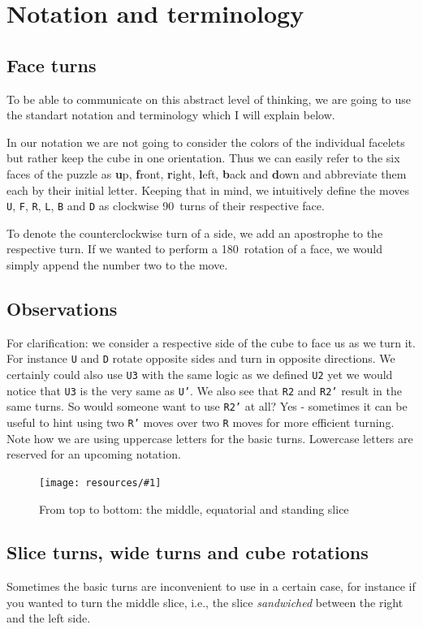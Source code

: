 \documentclass[a4paper]{scrreprt}
\newcommand{\img}[3]{
	\begin{figure}[ht]
	\centering
  \texttt{[image: resources/\#1]}
	\caption{#3}
	\end{figure}
}
\begin{document}
\section{Notation and terminology}
\subsection{Face turns}
To be able to communicate on this abstract level of thinking, we are going to use the standart notation and terminology which I will explain below.\par
In our notation we are not going to consider the colors of the individual facelets but rather keep the cube in one orientation. Thus we can easily refer to the six faces of the puzzle as \textbf{u}p, \textbf{f}ront, \textbf{r}ight, \textbf{l}eft, \textbf{b}ack and \textbf{d}own and abbreviate them each by their initial letter. Keeping that in mind, we intuitively define the moves \texttt{U}, \texttt{F}, \texttt{R}, \texttt{L}, \texttt{B} and \texttt{D} as clockwise 90\textdegree\ turns of their respective face.\par
To denote the counterclockwise turn of a side, we add an apostrophe to the respective turn. If we wanted to perform a 180\textdegree\ rotation of a face, we would simply append the number two to the move.


\subsection{Observations}
For clarification: we consider a respective side of the cube to face us as we turn it. For instance \texttt{U} and \texttt{D} rotate opposite sides and turn in opposite directions. We certainly could also use \texttt{U3} with the same logic as we defined \texttt{U2} yet we would notice that \texttt{U3} is the very same as \texttt{U'}. We also see that \texttt{R2} and \texttt{R2'} result in the same turns. So would someone want to use \texttt{R2'} at all? Yes - sometimes it can be useful to hint using two \texttt{R'} moves over two \texttt{R} moves for more efficient turning. Note how we are using uppercase letters for the basic turns. Lowercase letters are reserved for an upcoming notation.

\img{slices.png}{0.4}{From top to bottom: the middle, equatorial and standing slice}

\subsection{Slice turns, wide turns and cube rotations}
Sometimes the basic turns are inconvenient to use in a certain case, for instance if you wanted to turn the middle slice, i.e., the slice \emph{sandwiched} between the right and the left side.\par
\end{document}
